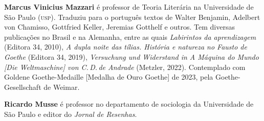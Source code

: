 \textbf{Marcus Vinicius Mazzari} é professor de Teoria Literária na Universidade de São Paulo (\textsc{usp}). Traduziu para o português textos de Walter Benjamin, Adelbert von Chamisso, Gottfried Keller, Jeremias Gotthelf e outros. Tem diversas publicações no Brasil e na Alemanha, entre as quais \textit{Labirintos da aprendizagem} (Editora 34, 2010), \textit{A dupla noite das tílias. História e natureza no Fausto de Goethe} (Editora 34, 2019), \textit{Versuchung und Widerstand in A Máquina do Mundo {[}Die Weltmaschine{]} von C.\,D.\,de Andrade} (Metzler, 2022). Contemplado com Goldene Goethe-Medaille {[}Medalha de Ouro Goethe{]} de 2023, pela Goethe-Gesellschaft de Weimar.

\textbf{Ricardo Musse} é professor no departamento de sociologia da Universidade
de São Paulo e editor do \textit{Jornal de Resenhas}.\par




